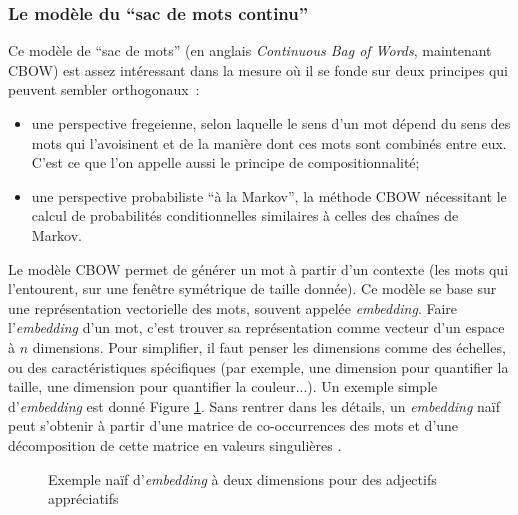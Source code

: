 \documentclass{article}
\begin{document}
			\subsubsection{Le modèle du ``sac de mots continu''}\label{cbow}
				Ce modèle de ``sac de mots'' (en anglais \textit{Continuous Bag of Words}, maintenant CBOW) est assez intéressant dans la mesure où il se fonde sur deux principes qui peuvent sembler orthogonaux~:
				\vspace{2mm}
				\begin{itemize}
					\item une perspective fregeienne, selon laquelle le sens d'un mot dépend du sens des mots qui l'avoisinent et de la manière dont ces mots sont combinés entre eux. C'est ce que l'on appelle aussi le principe de compositionnalité;
					\item une perspective probabiliste ``à la Markov'', la méthode CBOW nécessitant le calcul de probabilités conditionnelles similaires à celles des chaînes de Markov.
				\end{itemize}
				\vspace{2mm}
				Le modèle CBOW permet de générer un mot à partir d'un contexte (les mots qui l'entourent, sur une fenêtre symétrique de taille donnée). Ce modèle se base sur une représentation vectorielle des mots, souvent appelée \textit{embedding}. Faire l'\textit{embedding} d'un mot, c'est trouver sa représentation comme vecteur d'un espace à $n$ dimensions. Pour simplifier, il faut penser les dimensions comme des échelles, ou des caractéristiques spécifiques (par exemple, une dimension pour quantifier la taille, une dimension pour quantifier la couleur...). Un exemple simple d'\textit{embedding} est donné Figure \ref{embedding}. Sans rentrer dans les détails, un \textit{embedding} naïf peut s'obtenir à partir d'une matrice de co-occurrences des mots et d'une décomposition de cette matrice en valeurs singulières \cite{socher2016}.
				\begin{figure}
					\centering
				\caption{Exemple naïf d'\textit{embedding} à deux dimensions pour des adjectifs appréciatifs}
				\label{embedding}
				\end{figure}
\end{document}
